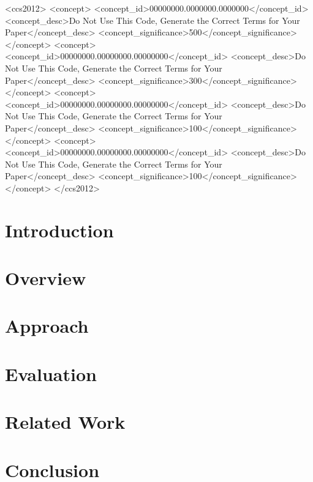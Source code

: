 \documentclass[acmsmall,nonacm,review,anonymous]{acmart}
\begin{document}
\begin{CCSXML}
<ccs2012>
 <concept>
  <concept_id>00000000.0000000.0000000</concept_id>
  <concept_desc>Do Not Use This Code, Generate the Correct Terms for Your Paper</concept_desc>
  <concept_significance>500</concept_significance>
 </concept>
 <concept>
  <concept_id>00000000.00000000.00000000</concept_id>
  <concept_desc>Do Not Use This Code, Generate the Correct Terms for Your Paper</concept_desc>
  <concept_significance>300</concept_significance>
 </concept>
 <concept>
  <concept_id>00000000.00000000.00000000</concept_id>
  <concept_desc>Do Not Use This Code, Generate the Correct Terms for Your Paper</concept_desc>
  <concept_significance>100</concept_significance>
 </concept>
 <concept>
  <concept_id>00000000.00000000.00000000</concept_id>
  <concept_desc>Do Not Use This Code, Generate the Correct Terms for Your Paper</concept_desc>
  <concept_significance>100</concept_significance>
 </concept>
</ccs2012>
\end{CCSXML}




\maketitle

\section{Introduction}
\label{sec:introduction}


\section{Overview}
\label{sec:overview}

\section{Approach}
\label{sec:approach}

\section{Evaluation}
\label{sec:evaluation}

\section{Related Work}
\label{sec:related_work}

\section{Conclusion}





\end{document}
